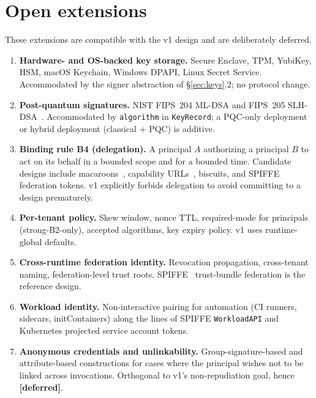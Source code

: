 \documentclass[11pt,a4paper]{article}
\newcommand{\deferred}{\textcolor{deferredcolor}{\textbf{[deferred]}}\xspace}
\begin{document}
\section{Open extensions}
\label{sec:gaps}

These extensions are compatible with the v1 design and are
deliberately deferred.

\begin{enumerate}[leftmargin=2em,itemsep=0.3em]
    \item \textbf{Hardware- and OS-backed key storage.} Secure Enclave,
    TPM, YubiKey, HSM, macOS Keychain, Windows DPAPI, Linux Secret
    Service. Accommodated by the signer abstraction of
    \S\ref{sec:keys}.2; no protocol change.

    \item \textbf{Post-quantum signatures.} NIST FIPS~204 ML-DSA and
    FIPS~205 SLH-DSA~\cite{fips204}. Accommodated by
    \texttt{algorithm} in \texttt{KeyRecord}; a PQC-only deployment or
    hybrid deployment (classical + PQC) is additive.

    \item \textbf{Binding rule B4 (delegation).} A principal $A$
    authorizing a principal $B$ to act on its behalf in a bounded
    scope and for a bounded time. Candidate designs include
    macaroons~\cite{birgisson2014macaroons}, capability
    URLs~\cite{capurl}, biscuits, and SPIFFE federation tokens. v1
    explicitly forbids delegation to avoid committing to a design
    prematurely.

    \item \textbf{Per-tenant policy.} Skew window, nonce TTL,
    required-mode for principals (strong-B2-only), accepted algorithms,
    key expiry policy. v1 uses runtime-global defaults.

    \item \textbf{Cross-runtime federation identity.} Revocation
    propagation, cross-tenant naming, federation-level trust roots.
    SPIFFE~\cite{spiffe} trust-bundle federation is the reference
    design.

    \item \textbf{Workload identity.} Non-interactive pairing for
    automation (CI runners, sidecars, initContainers) along the lines
    of SPIFFE \texttt{WorkloadAPI} and Kubernetes projected service
    account tokens.

    \item \textbf{Anonymous credentials and unlinkability.}
    Group-signature-based and attribute-based constructions for cases
    where the principal wishes not to be linked across invocations.
    Orthogonal to v1's non-repudiation goal, hence \deferred.


\end{enumerate}
\end{document}
